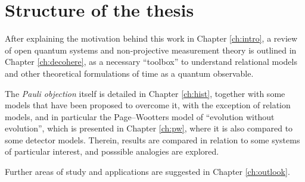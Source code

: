 \section{Structure of the thesis}\label{sec:struct}

After explaining the motivation behind this work in Chapter \ref{ch:intro},
a review of open quantum systems and non-projective measurement theory
is outlined in Chapter \ref{ch:decohere}, as a necessary ``toolbox''
to understand relational models and other theoretical formulations
of time as a quantum observable.

The \emph{Pauli objection} itself is detailed in Chapter \ref{ch:hist},
together with some models that have been proposed to overcome it,
with the exception of relation models, and in particular the Page--Wootters model
of ``evolution without evolution'',
which is presented in Chapter \ref{ch:pw},
where it is also compared to some detector models.
Therein, results are compared in relation to some systems of particular interest,
and posssible analogies are explored.

Further areas of study and applications are suggested in Chapter \ref{ch:outlook}.